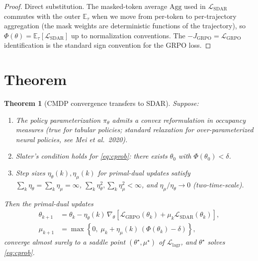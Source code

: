 \documentclass[11pt]{article}
\newtheorem{theorem}{Theorem}
\newcommand{\Lsdar}{\mathcal{L}_{\mathrm{SDAR}}}
\newcommand{\Lgrpo}{\mathcal{L}_{\mathrm{GRPO}}}
\newcommand{\Jgrpo}{J_{\mathrm{GRPO}}}
\begin{document}
\begin{proof}
Direct substitution. The masked-token average $\mathrm{Agg}$ used in $\Lsdar$ commutes with the outer $\mathbb{E}_\tau$ when we move from per-token to per-trajectory aggregation (the mask weights are deterministic functions of the trajectory), so $\Phi(\theta) = \mathbb{E}_\tau[\Lsdar]$ up to normalization conventions. The $-\Jgrpo = \Lgrpo$ identification is the standard sign convention for the GRPO loss.
\end{proof}

\section*{Theorem}

\begin{theorem}[CMDP convergence transfers to SDAR]\label{thm:transfer}
Suppose:
\begin{enumerate}
  \item The policy parameterization $\pi_\theta$ admits a convex reformulation in occupancy measures (true for tabular policies; standard relaxation for over-parameterized neural policies, see Mei et al.\ 2020).
  \item Slater's condition holds for \eqref{eq:cprob}: there exists $\theta_0$ with $\Phi(\theta_0) < \delta$.
  \item Step sizes $\eta_\theta(k), \eta_\mu(k)$ for primal-dual updates satisfy $\sum_k \eta_\theta = \sum_k \eta_\mu = \infty$, $\sum_k \eta_\theta^2, \sum_k \eta_\mu^2 < \infty$, and $\eta_\mu / \eta_\theta \to 0$ (two-time-scale).
\end{enumerate}
Then the primal-dual updates
\begin{align*}
\theta_{k+1} &= \theta_k - \eta_\theta(k)\, \nabla_\theta\!\left[\Lgrpo(\theta_k) + \mu_k \Lsdar(\theta_k)\right], \\
\mu_{k+1} &= \max\!\left\{0,\; \mu_k + \eta_\mu(k)\, (\Phi(\theta_k) - \delta)\right\},
\end{align*}
converge almost surely to a saddle point $(\theta^\star, \mu^\star)$ of $\mathcal{L}_{\mathrm{lagr}}$, and $\theta^\star$ solves \eqref{eq:cprob}.
\end{theorem}
\end{document}
